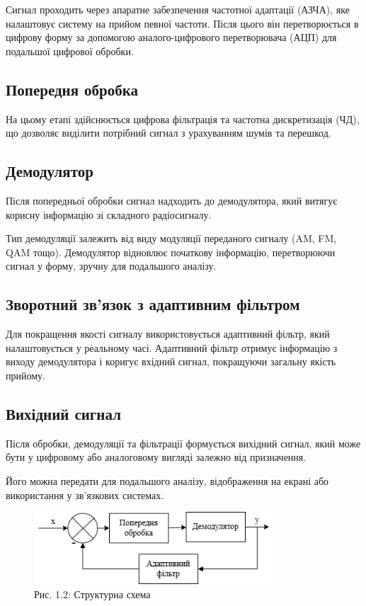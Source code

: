 \documentclass[a4paper]{article}
\begin{document}
Сигнал проходить через апаратне забезпечення частотної адаптації (АЗЧА), яке налаштовує систему на прийом певної частоти. Після цього він перетворюється в цифрову форму за допомогою аналого-цифрового перетворювача (АЦП) для подальшої цифрової обробки.  

\subsection*{Попередня обробка}  
На цьому етапі здійснюється цифрова фільтрація та частотна дискретизація (ЧД), що дозволяє виділити потрібний сигнал з урахуванням шумів та перешкод.  

\subsection*{Демодулятор}  
Після попередньої обробки сигнал надходить до демодулятора, який витягує корисну інформацію зі складного радіосигналу.  

Тип демодуляції залежить від виду модуляції переданого сигналу (AM, FM, QAM тощо). Демодулятор відновлює початкову інформацію, перетворюючи сигнал у форму, зручну для подальшого аналізу.

\subsection*{Зворотний зв'язок з адаптивним фільтром}  
Для покращення якості сигналу використовується адаптивний фільтр, який налаштовується у реальному часі.  
Адаптивний фільтр отримує інформацію з виходу демодулятора і коригує вхідний сигнал, покращуючи загальну якість прийому.

\subsection*{Вихідний сигнал}  
Після обробки, демодуляції та фільтрації формується вихідний сигнал, який може бути у цифровому або аналоговому вигляді залежно від призначення.  

Його можна передати для подальшого аналізу, відображення на екрані або використання у зв'язкових системах.


\begin{figure}[h]
    \centering
    \includegraphics[width=0.8\textwidth]{imgs/PW1.2.drawio.png}
    \caption*{Рис. 1.2: Структурна схема}
\end{figure} 
\end{document}

